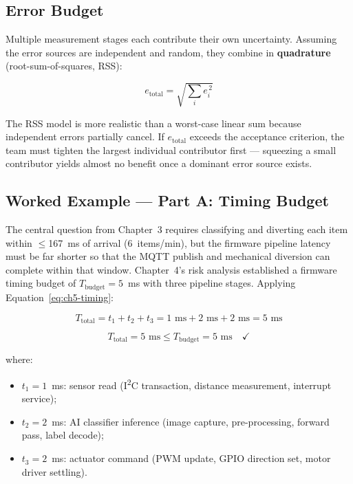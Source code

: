 \subsection{Error Budget}
\label{subsec:ch5-error-budget}

Multiple measurement stages each contribute their own uncertainty.
Assuming the error sources are independent and random, they combine in \textbf{quadrature} (root-sum-of-squares, RSS):

\begin{equation}
  e_{\text{total}} = \sqrt{\sum_{i} e_i^{\,2}}
  \label{eq:ch5-rss}
\end{equation}

The RSS model is more realistic than a worst-case linear sum because independent errors partially cancel.
If $e_{\text{total}}$ exceeds the acceptance criterion, the team must tighten the largest individual contributor first --- squeezing a small contributor yields almost no benefit once a dominant error source exists.

\subsection{Worked Example --- Part A: Timing Budget}
\label{subsec:ch5-worked-timing}

The central question from Chapter~3 requires classifying and diverting each item within $\leq$167~ms of arrival (6~items/min), but the firmware pipeline latency must be far shorter so that the MQTT publish and mechanical diversion can complete within that window.
Chapter~4's risk analysis established a firmware timing budget of $T_{\text{budget}} = 5$~ms with three pipeline stages.
Applying Equation~\ref{eq:ch5-timing}:

\[
  T_{\text{total}} = t_1 + t_2 + t_3 = 1\text{ ms} + 2\text{ ms} + 2\text{ ms} = 5\text{ ms}
\]

\[
  T_{\text{total}} = 5\text{ ms} \leq T_{\text{budget}} = 5\text{ ms} \quad \checkmark
\]

\noindent where:
\begin{itemize}
  \item $t_1 = 1$~ms: sensor read (I\textsuperscript{2}C transaction, distance measurement, interrupt service);
  \item $t_2 = 2$~ms: AI classifier inference (image capture, pre-processing, forward pass, label decode);
  \item $t_3 = 2$~ms: actuator command (PWM update, GPIO direction set, motor driver settling).
\end{itemize}

